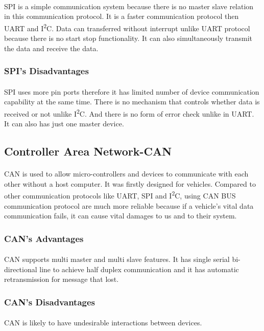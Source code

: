 \documentclass[pdftex,12pt,a4paper]{article}
\begin{document}
\begin{flushleft}
\paragraph{}
SPI is a simple communication system because there is no master slave relation in this communication protocol. It is a faster communication protocol then UART and I\textsuperscript{2}C. Data can transferred without interrupt unlike UART protocol because there is no start stop functionality. It can also simultaneously transmit the data and receive the data. 

\subsubsection{SPI's Disadvantages}
\paragraph{}
SPI uses more pin ports therefore it has limited number of device communication capability at the same time. There is no mechanism that controls whether data is received or not unlike I\textsuperscript{2}C. And there is no form of error check unlike in UART. It can also has just one master device.

\subsection{Controller Area Network-CAN}
\paragraph{}
CAN is used to allow micro-controllers and devices to communicate with each other without a host computer. It was firstly designed for vehicles. Compared to other communication protocols like UART, SPI and I\textsuperscript{2}C, using CAN BUS communication protocol are much more reliable because if a vehicle's vital data communication fails, it can cause vital damages to us and to their system. 

\subsubsection{CAN's Advantages}
\paragraph{}
CAN supports multi master and multi slave features. It has single serial bi-directional line to achieve half duplex communication and it has automatic retransmission for message that lost.


\subsubsection{CAN's Disadvantages}
\paragraph{}
CAN is likely to have undesirable interactions between devices.


\end{flushleft}
\end{document}
